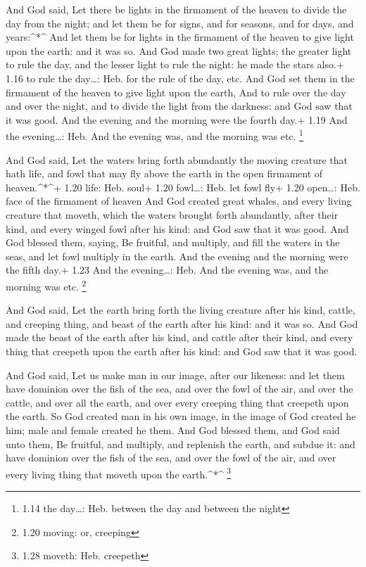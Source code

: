  And God said, Let there be lights in the firmament of the
heaven to divide the day from the night; and let them be for signs, and
for seasons, and for days, and years:\^{}*\^{}  And let
them be for lights in the firmament of the heaven to give light upon the
earth: and it was so.  And God made two great lights; the
greater light to rule the day, and the lesser light to rule the night:
he made the stars also.+ 1.16 to rule the day\ldots: Heb. for the rule
of the day, etc.  And God set them in the firmament of the
heaven to give light upon the earth,  And to rule over the
day and over the night, and to divide the light from the darkness: and
God saw that it was good.  And the evening and the morning
were the fourth day.+ 1.19 And the evening\ldots: Heb. And the evening
was, and the morning was etc. \footnote{1.14 the day\ldots: Heb. between
  the day and between the night}

 And God said, Let the waters bring forth abundantly the
moving creature that hath life, and fowl that may fly above the earth in
the open firmament of heaven.\^{}*\^{}+ 1.20 life: Heb. soul+ 1.20
fowl\ldots: Heb. let fowl fly+ 1.20 open\ldots: Heb. face of the
firmament of heaven  And God created great whales, and
every living creature that moveth, which the waters brought forth
abundantly, after their kind, and every winged fowl after his kind: and
God saw that it was good.  And God blessed them, saying, Be
fruitful, and multiply, and fill the waters in the seas, and let fowl
multiply in the earth.  And the evening and the morning
were the fifth day.+ 1.23 And the evening\ldots: Heb. And the evening
was, and the morning was etc. \footnote{1.20 moving: or, creeping}

 And God said, Let the earth bring forth the living
creature after his kind, cattle, and creeping thing, and beast of the
earth after his kind: and it was so.  And God made the
beast of the earth after his kind, and cattle after their kind, and
every thing that creepeth upon the earth after his kind: and God saw
that it was good.

 And God said, Let us make man in our image, after our
likeness: and let them have dominion over the fish of the sea, and over
the fowl of the air, and over the cattle, and over all the earth, and
over every creeping thing that creepeth upon the earth.  So
God created man in his own image, in the image of God created he him;
male and female created he them.  And God blessed them, and
God said unto them, Be fruitful, and multiply, and replenish the earth,
and subdue it: and have dominion over the fish of the sea, and over the
fowl of the air, and over every living thing that moveth upon the
earth.\^{}*\^{} \footnote{1.28 moveth: Heb. creepeth}

